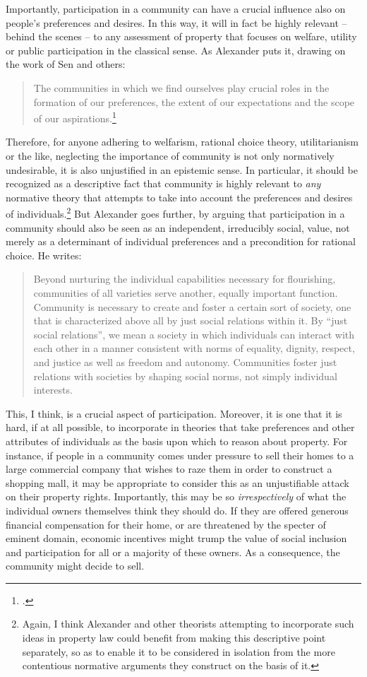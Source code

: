Importantly, participation in a community can have a crucial influence also on people's preferences and desires. In this way, it will in fact be highly relevant -- behind the scenes -- to any assessment of property that focuses on welfare, utility or public participation in the classical sense. As Alexander puts it, drawing on the work of Sen and others:
\begin{quote}
The communities in which we find ourselves play crucial roles in the formation of our preferences, the extent of our expectations and the scope of our aspirations.\footcite[140]{alexander09}
\end{quote}
Therefore, for anyone adhering to welfarism, rational choice theory, utilitarianism or the like, neglecting the importance of community is not only normatively undesirable, it is also unjustified in an epistemic sense. In particular, it should be recognized as a descriptive fact that community is highly relevant to {\it any} normative theory that attempts to take into account the preferences and desires of individuals.\footnote{Again, I think Alexander and other theorists attempting to incorporate such ideas in property law could benefit from making this descriptive point separately, so as to enable it to be considered in isolation from the more contentious normative arguments they construct on the basis of it.} But Alexander goes further, by arguing that participation in a community should also be seen as an independent, irreducibly social, value, not merely as a determinant of individual preferences and a precondition for rational choice. He writes:

\begin{quote}
Beyond nurturing the individual capabilities necessary for flourishing, communities of all varieties serve another, equally important function. Community is necessary to create and foster a certain sort of society, one that is characterized above all by just social relations within it. By ``just social relations'', we mean a society in which individuals can interact with each other in a manner consistent with norms of equality, dignity, respect, and justice as well as freedom and autonomy. Communities foster just relations with societies by shaping social norms, not simply individual interests.
\end{quote}

This, I think, is a crucial aspect of participation. Moreover, it is one that it is hard, if at all possible, to incorporate in theories that take  preferences and other attributes of individuals as the basis upon which to reason about property. For instance, if people in a community comes under pressure to sell their homes to a large commercial company that wishes to raze them in order to construct a shopping mall, it may be appropriate to consider this as an unjustifiable attack on their property rights. Importantly, this may be so {\it irrespectively} of what the individual owners themselves think they should do. If they are offered generous financial compensation for their home, or are threatened by the specter of eminent domain, economic incentives might trump the value of social inclusion and participation for all or a majority of these owners. As a consequence, the community might decide to sell.  

